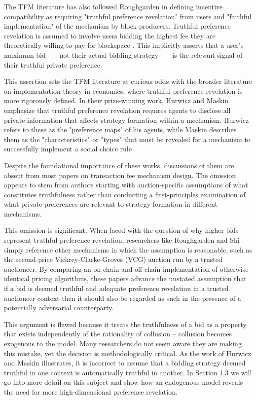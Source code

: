 \documentclass[oneside]{article}   	%
\begin{document}
The TFM literature has also followed Roughgarden in defining incentive compatibility as requiring "truthful preference revelation" from users and "faithful implementation" of the mechanism by block producers. Truthful preference revelation is assumed to involve users bidding the highest fee they are theoretically willing to pay for blockspace \cite{roughgarden2024, chung2023foundations}. This implicitly asserts that a user’s maximum bid -— not their actual bidding strategy -— is the relevant signal of their truthful private preference.

This assertion sets the TFM literature at curious odds with the broader literature on implementation theory in economics, where truthful preference revelation is more rigorously defined. In their prize-winning work, Hurwicz and Maskin emphasize that truthful preference revelation requires agents to disclose all private information that affects strategy formation within a mechanism. Hurwicz refers to these as the "preference maps" of his agents, while Maskin describes them as the "characteristics" or "types" that must be revealed for a mechanism to successfully implement a social choice rule \cite{hurwicz1973design, hurwicz1960optimality, hurwicz2007guardians, hurwicz1979allocations, maskin1999nash, maskin2002}.

Despite the foundational importance of these works, discussions of them are absent from most papers on transaction fee mechanism design. The omission appears to stem from authors starting with auction-specific assumptions of what constitutes truthfulness rather than conducting a first-principles examination of what private preferences are relevant to strategy formation in different mechanisms.

This omission is significant. When faced with the question of why higher bids represent truthful preference revelation, researchers like Roughgarden and Shi simply reference other mechanisms in which the assumption is reasonable, such as the second-price Vickrey-Clarke-Groves (VCG) auction run by a trusted auctioneer. By comparing an on-chain and off-chain implementation of otherwise identical pricing algorithms, these papers advance the unstated assumption that if a bid is deemed truthful and adequate preference revelation in a trusted auctioneer context then it should also be regarded as such in the presence of a potentially adversarial counterparty.

This argument is flawed because it treats the truthfulness of a bid as a property that exists independently of the rationality of collusion -- collusion becomes exogenous to the model. Many researchers do not seem aware they are making this mistake, yet the decision is methodologically critical. As the work of Hurwicz and Maskin illustrates, it is incorrect to assume that a bidding strategy deemed truthful in one context is automatically truthful in another. In Section 1.3 we will go into more detail on this subject and show how an endogenous model reveals the need for more high-dimensional preference revelation.
\end{document}
